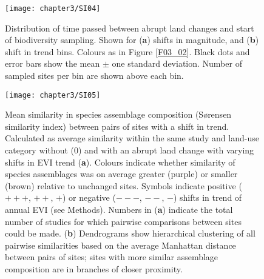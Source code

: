 \begin{figure}[htb]
\centering
\texttt{[image: chapter3/SI04]}
\caption{ Distribution of time passed between abrupt land changes and start of biodiversity sampling. Shown for (\textbf{a}) shifts in magnitude, and (\textbf{b}) shift in trend bins. Colours as in Figure \ref{F03_02}. Black dots and error bars show the mean $\pm$ one standard deviation. Number of sampled sites per bin are shown above each bin.}
\label{SI03_04}
\end{figure}

\begin{figure}[htb]
\centering
\texttt{[image: chapter3/SI05]}
\caption{ Mean similarity in species assemblage composition (S\o rensen similarity index) between pairs of sites with a shift in trend. Calculated as average similarity within the same study and land-use category without (0) and with an abrupt land change with varying shifts in EVI trend (\textbf{a}). Colours indicate whether similarity of species assemblages was on average greater (purple) or smaller (brown) relative to unchanged sites. Symbols indicate positive ($+++$, $++$, $+$) or negative ($---$, $--$, $-$) shifts in trend of annual EVI (see Methods). Numbers in (\textbf{a}) indicate the total number of studies for which pairwise comparisons between sites could be made. (\textbf{b}) Dendrograms show hierarchical clustering of all pairwise similarities based on the average Manhattan distance between pairs of sites; sites with more similar assemblage composition are in branches of closer proximity. }
\label{SI03_05}
\end{figure}

\clearpage
